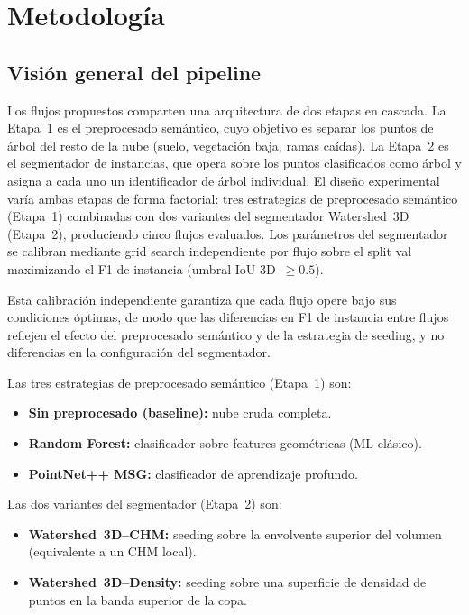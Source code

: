\documentclass[runningheads]{llncs}
\begin{document}
\section{Metodolog\'ia}\label{sec:method}

\subsection{Visi\'on general del pipeline}

Los flujos propuestos comparten una arquitectura de dos etapas en cascada. La Etapa~1 es el preprocesado sem\'antico, cuyo objetivo es separar los puntos de \'arbol del resto de la nube (suelo, vegetaci\'on baja, ramas ca\'idas). La Etapa~2 es el segmentador de instancias, que opera sobre los puntos clasificados como \'arbol y asigna a cada uno un identificador de \'arbol individual. El dise\~no experimental var\'ia ambas etapas de forma factorial: tres estrategias de preprocesado sem\'antico (Etapa~1) combinadas con dos variantes del segmentador Watershed~3D (Etapa~2), produciendo cinco flujos evaluados. Los par\'ametros del segmentador se calibran mediante grid search independiente por flujo sobre el split val maximizando el F1 de instancia (umbral IoU 3D~$\geq 0.5$).

Esta calibraci\'on independiente garantiza que cada flujo opere bajo sus condiciones \'optimas, de modo que las diferencias en F1 de instancia entre flujos reflejen el efecto del preprocesado sem\'antico y de la estrategia de seeding, y no diferencias en la configuraci\'on del segmentador.

Las tres estrategias de preprocesado sem\'antico (Etapa~1) son:
\begin{itemize}
  \item \textbf{Sin preprocesado (baseline):} nube cruda completa.
  \item \textbf{Random Forest:} clasificador sobre features geom\'etricas (ML cl\'asico).
  \item \textbf{PointNet++ MSG:} clasificador de aprendizaje profundo.
\end{itemize}

Las dos variantes del segmentador (Etapa~2) son:
\begin{itemize}
  \item \textbf{Watershed~3D--CHM:} seeding sobre la envolvente superior del volumen (equivalente a un CHM local).
  \item \textbf{Watershed~3D--Density:} seeding sobre una superficie de densidad de puntos en la banda superior de la copa.
\end{itemize}
\end{document}
